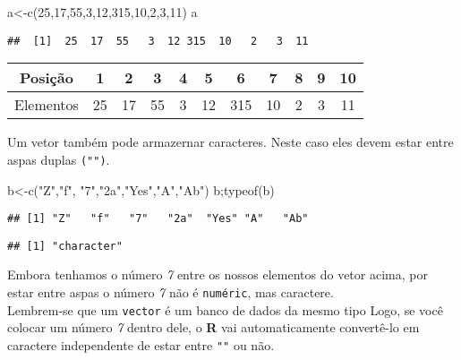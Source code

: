 \documentclass[
]{book}
\newenvironment{Shaded}{\begin{snugshade}}{\end{snugshade}}
\newcommand{\DecValTok}[1]{\textcolor[rgb]{0.00,0.00,0.81}{#1}}
\newcommand{\FunctionTok}[1]{\textcolor[rgb]{0.00,0.00,0.00}{#1}}
\newcommand{\NormalTok}[1]{#1}
\newcommand{\OtherTok}[1]{\textcolor[rgb]{0.56,0.35,0.01}{#1}}
\newcommand{\StringTok}[1]{\textcolor[rgb]{0.31,0.60,0.02}{#1}}
\begin{document}
\begin{Shaded}
\begin{Highlighting}[]
\NormalTok{a}\OtherTok{\textless{}{-}}\FunctionTok{c}\NormalTok{(}\DecValTok{25}\NormalTok{,}\DecValTok{17}\NormalTok{,}\DecValTok{55}\NormalTok{,}\DecValTok{3}\NormalTok{,}\DecValTok{12}\NormalTok{,}\DecValTok{315}\NormalTok{,}\DecValTok{10}\NormalTok{,}\DecValTok{2}\NormalTok{,}\DecValTok{3}\NormalTok{,}\DecValTok{11}\NormalTok{)}
\NormalTok{a}
\end{Highlighting}
\end{Shaded}

\begin{verbatim}
##  [1]  25  17  55   3  12 315  10   2   3  11
\end{verbatim}

\begin{longtable}[]{@{}ccccccccccc@{}}
\toprule
Posição & 1 & 2 & 3 & 4 & 5 & 6 & 7 & 8 & 9 & 10 \\
\midrule
\endhead
Elementos & 25 & 17 & 55 & 3 & 12 & 315 & 10 & 2 & 3 & 11 \\
\bottomrule
\end{longtable}

Um vetor também pode armazernar caracteres. Neste caso eles devem estar entre aspas duplas \texttt{("")}.

\begin{Shaded}
\begin{Highlighting}[]
\NormalTok{b}\OtherTok{\textless{}{-}}\FunctionTok{c}\NormalTok{(}\StringTok{"Z"}\NormalTok{,}\StringTok{"f"}\NormalTok{, }\StringTok{"7"}\NormalTok{,}\StringTok{"2a"}\NormalTok{,}\StringTok{"Yes"}\NormalTok{,}\StringTok{"A"}\NormalTok{,}\StringTok{"Ab"}\NormalTok{)}
\NormalTok{b;}\FunctionTok{typeof}\NormalTok{(b)}
\end{Highlighting}
\end{Shaded}

\begin{verbatim}
## [1] "Z"   "f"   "7"   "2a"  "Yes" "A"   "Ab"
\end{verbatim}

\begin{verbatim}
## [1] "character"
\end{verbatim}

Embora tenhamos o número \emph{7} entre os nossos elementos do vetor acima, por estar entre aspas o número \emph{7} não é \texttt{numéric}, mas caractere.\\
Lembrem-se que um \texttt{vector} é um banco de dados da mesmo tipo Logo, se você colocar um número \emph{7} dentro dele, o \textbf{R} vai automaticamente convertê-lo em caractere independente de estar entre \texttt{""} ou não.
\end{document}
